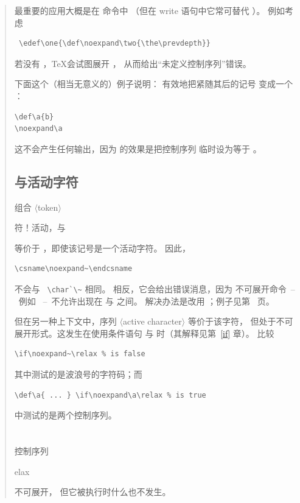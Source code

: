 \documentclass[a4paper]{rapport3}
\makeatletter
\def\gr#1{$\langle$#1$\rangle$}\def\key#1{{\tt#1}}
\def\ldash{\unskip\ --\nobreak\ \ignorespaces}
\def\rdash{\unskip\nobreak\ --\ \ignorespaces}
\newenvironment{disp}{\begin{quotation}}{\end{quotation}}
\def\term#1\par{\index{#1}}
\def\cstoidx#1\par{\index{#1@\cs{#1}}}
\def\csidx#1{\cstoidx #1\par\cs{#1}}
\makeatother
\begin{document}
\begin{disp}
 最重要的应用大概是在  命令中
（但在 write 语句中它常可替代 ）。
例如考虑
\begin{verbatim}
 \edef\one{\def\noexpand\two{\the\prevdepth}}
\end{verbatim}
若没有 ，\TeX 会试图展开 ，
从而给出“未定义控制序列”错误。

下面这个（相当无意义的）例子说明： 有效地把紧随其后的记号
变成一个 ：
\begin{verbatim}
\def\a{b}
\noexpand\a
\end{verbatim}
这不会产生任何输出，因为  的效果是把控制序列
 临时设为等于 。

\subsection{\protect{} 与活动字符}

组合 \gr{token}
\term 字符！活动，与 \par
等价于 ，即使该记号是一个活动字符。
因此，
\begin{verbatim}
\csname\noexpand~\endcsname
\end{verbatim}
不会与 ~\verb>\char`\~> 相同。
相反，它会给出错误消息，因为
不可展开命令\ldash 例如 \rdash 不允许出现在
 与  之间。
解决办法是改用 ；例子见第~\pageref{store:cat} 页。

但在另一种上下文中，序列
\gr{active character} 等价于该字符，
但处于不可展开形式。这发生在使用条件语句
 与  时（其解释见第~\ref{if} 章）。
比较
\begin{verbatim}
\if\noexpand~\relax % is false
\end{verbatim}
其中测试的是波浪号的字符码；而
\begin{verbatim}
\def\a{ ... } \if\noexpand\a\relax % is true
\end{verbatim}
中测试的是两个控制序列。

\section{\protect{}}

控制序列 \csidx{relax} 不可展开，
但它被执行时什么也不发生。


\end{disp}
\end{document}
